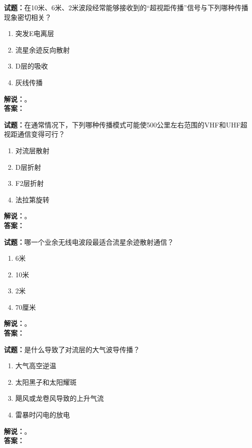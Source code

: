 \documentclass{ctexbook}
\begin{document}
\bigskip




\noindent\textbf{试题：}在10米、6米、2米波段经常能够接收到的“超视距传播”信号与下列哪种传播现象密切相关？
\begin{enumerate}[leftmargin=3em]
\item 突发E电离层
\item 流星余迹反向散射
\item D层的吸收
\item 灰线传播
\end{enumerate}
\noindent\textbf{解说：}\textbf{}。\\\noindent\textbf{答案：}

\bigskip




\noindent\textbf{试题：}在通常情况下，下列哪种传播模式可能使500公里左右范围的VHF和UHF超视距通信变得可行？
\begin{enumerate}[leftmargin=3em]
\item 对流层散射
\item D层折射
\item F2层折射
\item 法拉第旋转
\end{enumerate}
\noindent\textbf{解说：}\textbf{}。\\\noindent\textbf{答案：}

\bigskip




\noindent\textbf{试题：}哪一个业余无线电波段最适合流星余迹散射通信？
\begin{enumerate}[leftmargin=3em]
\item 6米
\item 10米
\item 2米
\item 70厘米
\end{enumerate}
\noindent\textbf{解说：}\textbf{}。\\\noindent\textbf{答案：}

\bigskip




\noindent\textbf{试题：}是什么导致了对流层的大气波导传播？
\begin{enumerate}[leftmargin=3em]
\item 大气高空逆温
\item 太阳黑子和太阳耀斑
\item 飓风或龙卷风导致的上升气流
\item 雷暴时闪电的放电
\end{enumerate}
\noindent\textbf{解说：}\textbf{}。\\\noindent\textbf{答案：}
\end{document}
